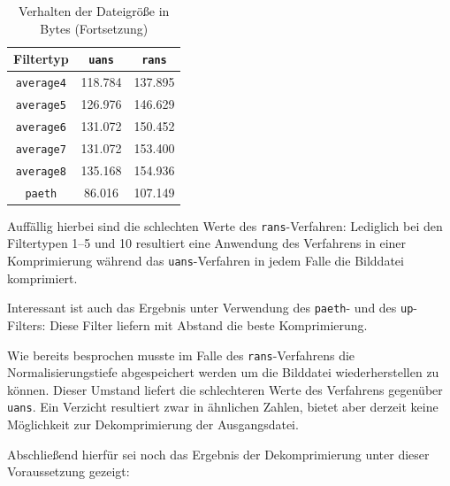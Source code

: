 \documentclass[a4paper,12pt]{article}
\begin{document}
\begin{table}[h]
\begin{center}
\begin{tabular}{c | c | c}
Filtertyp &  {\tt{uans}} & {\tt{rans}}
\\
\hline
{\tt{average4}} & 118.784& 137.895
\\
{\tt{average5}} & 126.976 & 146.629
\\
{\tt{average6}} & 131.072 & 150.452
\\
{\tt{average7}} & 131.072 & 153.400
\\
{\tt{average8}}& 135.168 & 154.936
\\
{\tt{paeth}} & 86.016 & 107.149
\end{tabular}
\caption{Verhalten der Dateigröße in Bytes (Fortsetzung)}
\end{center}
\end{table}
Auffällig hierbei sind die schlechten Werte des {\tt{rans}}-Verfahren: Lediglich bei den Filtertypen 1--5 und 10 resultiert eine Anwendung des Verfahrens in einer Komprimierung während das {\tt{uans}}-Verfahren in jedem Falle die Bilddatei komprimiert.
\par
Interessant ist auch das Ergebnis unter Verwendung des {\tt{paeth}}- und des {\tt{up}}-Filters: Diese Filter liefern mit Abstand die beste Komprimierung. 
\par
\vspace{0.5cm}
Wie bereits besprochen musste im Falle des {\tt{rans}}-Verfahrens die Normalisierungstiefe abgespeichert werden um die Bilddatei wiederherstellen zu können. Dieser Umstand liefert die schlechteren Werte des Verfahrens gegenüber {\tt{uans}}. Ein Verzicht resultiert zwar in ähnlichen Zahlen, bietet aber derzeit keine Möglichkeit zur Dekomprimierung der Ausgangsdatei.
\par
\vspace{0.5cm}
Abschließend hierfür sei noch das Ergebnis der Dekomprimierung unter dieser Voraussetzung gezeigt: 
\end{document}
